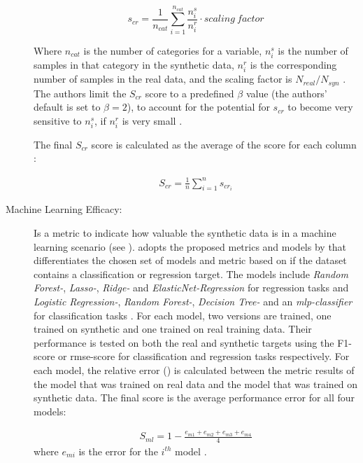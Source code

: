 \begin{description}
  $$ s_{cr} = \frac{1}{n_{cat}} \sum_{i=1}^{n_{cat}} \frac{n^s_i}{n^r_i} \cdot scaling~factor $$

  Where $n_{cat}$ is the number of categories for a variable, $n^s_i$ is the number of samples in that category in the synthetic data, $n^r_i$ is the corresponding number of samples in the real data, and the scaling factor is $N_{real}/N_{syn}$ \cite{chundawat2022UniversalMetricRobust}.
  The authors limit the $S_{cr}$ score to a predefined $\beta$ value (the authors' default is set to $\beta=2$), to account for the potential for $s_{cr}$ to become very sensitive to $n^s_i$, if $n^r_i$ is very small \cite{chundawat2022UniversalMetricRobust}.

  The final $S_{cr}$ score is calculated as the average of the score for each column \cite{chundawat2022UniversalMetricRobust}:

  \begin{equation}
    \begin{align*}
      \label{eqn:s_cr}
      S_{cr} = \frac{1}{n} \sum_{i=1}^{n} s_{cr_i}
      \end{align*}
  \end{equation}



  \item[Machine Learning Efficacy:]
  Is a metric to indicate how valuable the synthetic data is in a machine learning scenario (see ).
  \cite{chundawat2022UniversalMetricRobust} adopts the proposed metrics and models by \cite{brenninkmeijer2019GenerationEvaluationTabular} that differentiates the chosen set of models and metric based on
  if the dataset contains a classification or regression target.
  The models include \textit{Random Forest-}, \textit{Lasso-}, \textit{Ridge-} and \textit{ElasticNet-Regression} for regression tasks and \textit{Logistic Regression-}, \textit{Random Forest-},  \textit{Decision Tree-} and an \textit{\gls{mlp}-classifier} for classification tasks \cite{brenninkmeijer2019GenerationEvaluationTabular, chundawat2022UniversalMetricRobust}.
  For each \gls{model}, two versions are trained, one trained on synthetic and one trained on real training data.
  Their performance is tested on both the real and synthetic targets using the F1-score or \gls{rmse}-score for classification and regression tasks respectively.
  For each \gls{model}, the relative error () is calculated between the metric results of the \gls{model} that was trained on real data and the \gls{model} that was trained on synthetic data.
  The final score is the average performance error for all four models:

  \begin{equation}
    \begin{align*}
      \label{eqn:s_ml}
      S_{ml} = 1-\frac{e_{m1}+e_{m2}+e_{m3}+e_{m4}}{4}
      \end{align*}
  \end{equation}
  where $e_{mi}$ is the error for the $i^{th}$ \gls{model} \cite{chundawat2022UniversalMetricRobust}.
\end{description}

